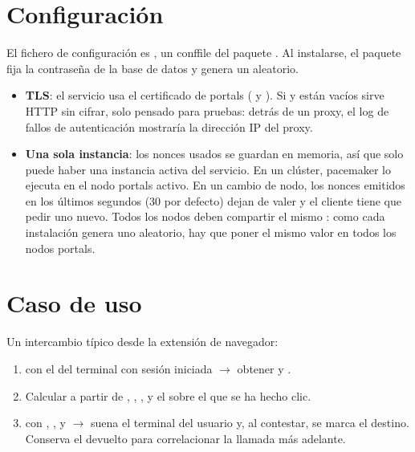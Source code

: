 \documentclass[letterpaper,10pt,spanish]{sphinxmanual}
\begin{document}
\section{Configuración}
\label{api_rest/click2call:configuration}
El fichero de configuración es , un conffile del paquete . Al instalarse, el paquete fija la contraseña de la base de datos y genera un  aleatorio.
\begin{itemize}
\item {} 
\textbf{TLS}: el servicio usa el certificado de portals ( y ). Si  y  están vacíos sirve HTTP sin cifrar, solo pensado para pruebas: detrás de un proxy, el log de fallos de autenticación mostraría la dirección IP del proxy.

\item {} 
\textbf{Una sola instancia}: los nonces usados se guardan en memoria, así que solo puede haber una instancia activa del servicio. En un clúster, pacemaker lo ejecuta en el nodo portals activo. En un cambio de nodo, los nonces emitidos en los últimos  segundos (30 por defecto) dejan de valer y el cliente tiene que pedir uno nuevo. Todos los nodos deben compartir el mismo : como cada instalación genera uno aleatorio, hay que poner el mismo valor en todos los nodos portals.

\end{itemize}


\section{Caso de uso}
\label{api_rest/click2call:use-case}
Un intercambio típico desde la extensión de navegador:
\begin{enumerate}
\item {} 
 con el  del terminal con sesión iniciada \(\rightarrow\) obtener  y .

\item {} 
Calcular  a partir de , , ,  y el  sobre el que se ha hecho clic.

\item {} 
 con , ,  y  \(\rightarrow\) suena el terminal del usuario y, al contestar, se marca el destino. Conserva el  devuelto para correlacionar la llamada más adelante.

\end{enumerate}
\end{document}

